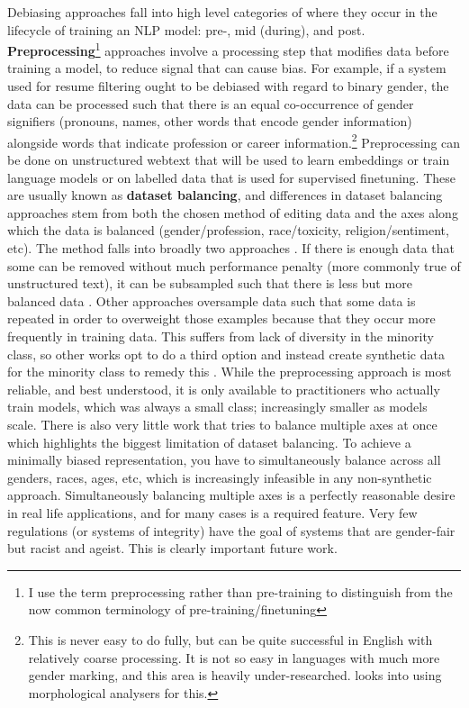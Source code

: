 Debiasing approaches fall into high level categories of where they occur in the lifecycle of training an NLP model: pre-, mid (during), and post. \textbf{Preprocessing}\footnote{I use the term preprocessing rather than pre-training to distinguish from the now common terminology of pre-training/finetuning} approaches involve a processing step that modifies data before training a model, to reduce signal that can cause bias. For example, if a system used for resume filtering ought to be debiased with regard to binary gender, the data can be processed such that there is an equal co-occurrence of gender signifiers (pronouns, names, other words that encode gender information) alongside words that indicate profession or career information.\footnote{This is never easy to do fully, but can be quite successful in English with relatively coarse processing. It is not so easy in languages with much more gender marking, and this area is heavily under-researched. \citet{gonen-etal-2019-grammatical} looks into using morphological analysers for this.}
Preprocessing can be done on unstructured webtext that will be used to learn embeddings or train language models or on labelled data that is used for supervised finetuning. These are usually known as \textbf{dataset balancing}, and differences in dataset balancing approaches stem from both the chosen method of editing data and the axes along which the data is balanced (gender/profession, race/toxicity, religion/sentiment, etc). The method falls into broadly two approaches \citep{schwartz-stanovsky-2022-limitations}. If there is enough data that some can be removed without much performance penalty (more commonly true of unstructured text), it can be subsampled such that there is less but more balanced data \citep{wang2019balanced}. Other approaches oversample data such that some data is repeated \citep{chawla2002smote} in order to overweight those examples because that they occur more frequently in training data. This suffers from lack of diversity in the minority class, so other works opt to do a third option and instead create synthetic data for the minority class to remedy this \citep{Dixon2018MeasuringAM, zhao-etal-2018-gender}. While the preprocessing approach is most reliable, and best understood, it is only available to practitioners who actually train models, which was always a small class; increasingly smaller as models scale. There is also very little work that tries to balance multiple axes at once  which highlights the biggest limitation of dataset balancing. To achieve a minimally biased representation, you have to simultaneously balance across all genders, races, ages, etc, which is increasingly infeasible in any non-synthetic approach. 
Simultaneously balancing multiple axes is a perfectly reasonable desire in real life applications, and for many cases is a required feature. Very few regulations (or systems of integrity) have the goal of systems that are gender-fair but racist and ageist. This is clearly important future work.

